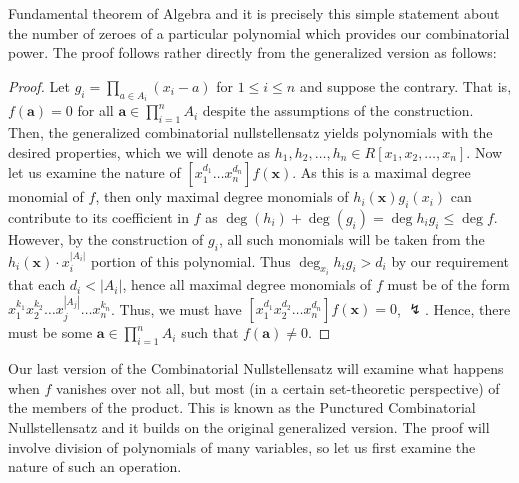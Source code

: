 	Fundamental theorem of Algebra and it is
	precisely this simple statement about the number of zeroes of a
	particular polynomial which provides our combinatorial power. The proof
	follows rather directly from the  generalized version
	as follows: \begin{proof}[Proof] Let $g_i = \prod_{a \in A_i}^{} \left(
		x_{i} - a \right) $ for $1 \le i \le n$ and suppose the
		contrary. That is, $f\left( \textbf{a} \right) = 0$ for all $
		\textbf{a} \in \prod_{i= 1}^{n} A_i $ despite the assumptions of the construction. Then, the
		generalized combinatorial nullstellensatz yields polynomials with the desired properties, which we will denote as
		$h_1, h_2, \ldots, h_n \in R[x_1, x_2, \ldots, x_{n}]$. Now let us examine the nature of
		$[x_1^{d_1}\ldots x_{n}^{ d_n}] f\left( \textbf{x} \right) $.
		As this is a maximal degree monomial of $f$, then only maximal
		degree monomials of $h_i \left( \textbf{x} \right)  g_i \left(
		x_i \right) $ can contribute to its coefficient in $f$ as $\deg \left( h_{i} \right) + \deg \left( g_{i} \right) = \deg
		h_i g_i \le \deg f$. However, by the construction of $g_i$, all
		such monomials will be taken from the $h_i \left( \textbf{x}
		\right) \cdot x_i ^{ \left| A_i \right| } $ portion of this
		polynomial. Thus $\deg _{x_{i}} h_i g_i> d_i$ by our
		requirement that each  $d_i < \left| A_i \right| $, hence all
	maximal degree monomials of $f$ must be of the form
$x_1^{k_1}x_2^{k_2}\ldots x_{j}^{\left| A_j \right|} \ldots x_{n}^{ k_n}$.
Thus, we must have $[x_1^{d_1}x_2^{d_2}\ldots x_{n}^{d_n}] f\left( \textbf{x}
\right) = 0$, $\lightning$. Hence, there must be some $ \textbf{a} \in \prod_{i=
1}^{n} A_i $ such that $f\left( \textbf{a} \right) \neq 0$.  \end{proof} Our
last version of the Combinatorial Nullstellensatz will examine what happens
when $f$ vanishes over not all, but most (in a certain set-theoretic
perspective) of the members of the product. This is known as the Punctured
Combinatorial Nullstellensatz and it builds on the original generalized
version. The proof will involve division of polynomials of many variables, so
let us first examine the nature of such an operation.
\newpage
